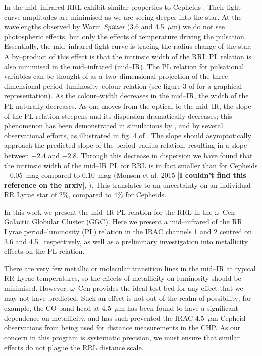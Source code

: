 \documentclass[a4paper,fleqn,usenatbib]{mnras}
\begin{document}
In the mid--infrared RRL exhibit similar properties to Cepheids \citep{2013ApJ...776..135M}. Their light curve amplitudes are minimised as we are seeing deeper into the star. At the wavelengths observed by Warm \textit{Spitzer} (3.6 and 4.5~$\mu$m) we do not see photospheric effects, but only the effects of temperature driving the pulsation. Essentially, the mid--infrared light curve is tracing the radius change of the star. A by--product of this effect is that the intrinsic width of the RRL PL relation is also minimised in the mid--infrared (mid--IR). The PL relation for pulsational variables can be thought of as a two--dimensional projection of the three--dimensional period--luminosity--colour relation (see figure 3 of \citet{1991PASP..103..933M} for a graphical representation). As the colour--width decreases in the mid--IR, the width of the PL naturally decreases. As one moves from the optical to the mid--IR, the slope of the PL relation steepens and its dispersion dramatically decreases; this phenomenon has been demonstrated in simulations by \citet{2004ApJS..154..633C}, and by several observational efforts, as illustrated in fig. 4 of \citet{2013ApJ...776..135M}. The slope should asymptotically approach the predicted slope of the period--radius relation, resulting in a slope between $-2.4$ and $-2.8$. Through this decrease in dispersion we have found that the intrinsic width of the mid--IR PL for RRL is in fact smaller than for Cepheids -- 0.05~mag compared to 0.10~mag (Monson et al. 2015 [{\bf I couldn't find this reference on the arxiv}], \citep{2015arXiv150507858N}). This translates to an uncertainty on an individual RR Lyrae star of 2\%, compared to 4\% for Cepheids. 

In this work we present the mid--IR PL relation for the RRL in the $\omega$~Cen Galactic Globular Cluster (GGC). 
Here we present a mid--infrared of the RR Lyrae period--luminosity (PL) relation in the IRAC channels 1 and 2 centred on 3.6 and 4.5 \micron\ respectively, as well as a preliminary investigation into metallicity effects on the PL relation.

There are very few metallic or molecular transition lines in the mid--IR at typical RR Lyrae temperatures, so the effects of metallicity on luminosity should be minimised. However, $\omega$~Cen provides the ideal test bed for any effect that we may not have predicted. Such an effect is not out of the realm of possibility; for example, the CO band head at 4.5~$\mu$m has been found to have a significant dependence on metallicity, and has such prevented the IRAC 4.5~$\mu$m Cepheid observations from being used for distance measurements in the CHP. As our concern in this program is systematic precision, we must ensure that similar effects do not plague the RRL distance scale.  
\end{document}
